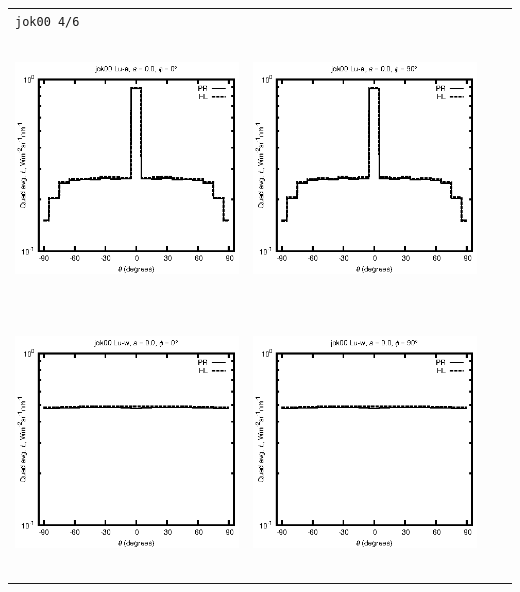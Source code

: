 \documentclass[10pt,a4paper]{article}
\begin{document}
\begin{adjustwidth}{-1.2in}{-1.2in}
\begin{tabular}{c c c c}
\multicolumn{4}{l}{\texttt{jok00 4/6}} \\
\includegraphics[height=7cm]{../eps/jok00_Lu_a_fwd.eps} &
\includegraphics[height=7cm]{../eps/jok00_Lu_a_cross.eps}\\
\includegraphics[height=7cm]{../eps/jok00_Lu_w_fwd.eps} &
\includegraphics[height=7cm]{../eps/jok00_Lu_w_cross.eps} \\

\end{tabular}
\end{adjustwidth}
\end{document}
